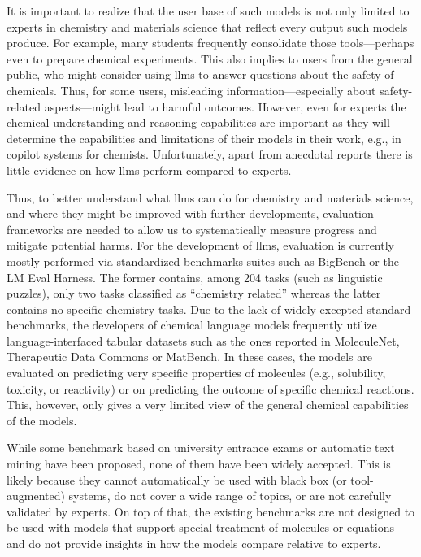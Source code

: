 \documentclass[11pt, oneside]{article}
\begin{document}
\begin{refsection}
It is important to realize that the user base of such models is not only limited to experts in chemistry and materials science that reflect every output such models produce. 
For example, many students frequently consolidate those tools---perhaps even to prepare chemical experiments.\autocite{Intelligent.com_2023}
This also implies to users from the general public, who might consider using \glspl{llm} to answer questions about the safety of chemicals.
Thus, for some users, misleading information---especially about safety-related aspects---might lead to harmful outcomes. 
However, even for experts the chemical understanding and reasoning capabilities are important as they will determine the capabilities and limitations of their models in their work, e.g., in copilot systems for chemists.
Unfortunately, apart from anecdotal reports there is little evidence on how \glspl{llm} perform compared to experts.

Thus, to better understand what \glspl{llm} can do for chemistry and materials science, and where they might be improved with further developments, evaluation frameworks are needed to allow us to systematically measure progress and mitigate potential harms.
For the development of \glspl{llm}, evaluation is currently mostly performed via standardized benchmarks suites such as BigBench\autocite{srivastava2022beyond} or the LM Eval Harness.\autocite{eval-harness}
The former contains, among 204 tasks (such as linguistic puzzles), only two tasks classified as \enquote{chemistry related} whereas the latter contains no specific chemistry tasks.
Due to the lack of widely excepted standard benchmarks, the developers of chemical language models\autocite{jablonka2024leveraging, guo2023large, ahmad2022chemberta2, Cai_2024, frey2023neural} frequently utilize language-interfaced\autocite{dinh2022lift} tabular datasets such as the ones reported in MoleculeNet,\autocite{wu2018moleculenet} Therapeutic Data Commons\autocite{huang2021therapeutics} or MatBench.\autocite{dunn2020benchmarking}
In these cases, the models are  evaluated on predicting very specific properties of molecules (e.g., solubility, toxicity, or reactivity) or on predicting the outcome of specific chemical reactions.
This, however, only gives a very limited view of the general chemical capabilities of the models.

While some benchmark based on university entrance exams\autocite{Zaki_2024, arora2023llms} or automatic text mining\autocite{song2023honeybee, wei2021chemistryqa} have been proposed, none of them have been widely accepted.
This is likely because they cannot automatically be used with black box (or tool-augmented) systems, do not cover a wide range of topics, or are not carefully validated by experts.
On top of that, the existing benchmarks are not designed to be used with models that support special treatment of molecules or equations and do not provide insights in how the models compare relative to experts.


\end{refsection}
\end{document}
